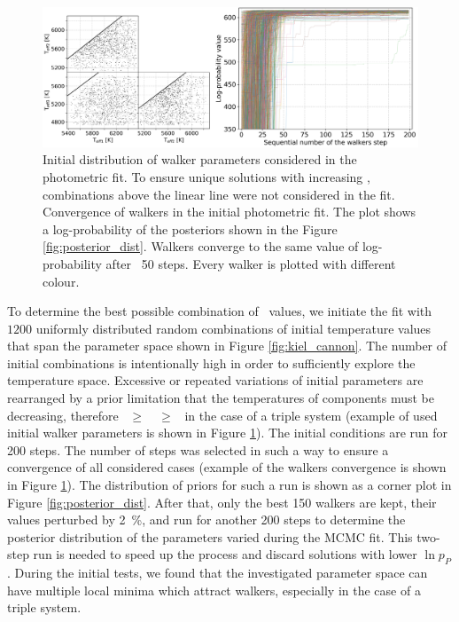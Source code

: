 \begin{figure}
	\centering
	\includegraphics[width=\textwidth]{150408004101169_p1884_init_3_walkers_comb.png}
	\caption{Initial distribution of walker parameters considered in the photometric fit. To ensure unique solutions with increasing \Teff, combinations above the linear line were not considered in the fit. Convergence of walkers in the initial photometric fit. The plot shows a log-probability of the posteriors shown in the Figure \ref{fig:posterior_dist}. Walkers converge to the same value of log-probability after ~50 steps. Every walker is plotted with different colour.}
	\label{fig:teff_initial_walkers}
\end{figure}

To determine the best possible combination of \Teff\ values, we initiate the fit with $1200$ uniformly distributed random combinations of initial temperature values that span the parameter space shown in Figure \ref{fig:kiel_cannon}. The number of initial combinations is intentionally high in order to sufficiently explore the temperature space. Excessive or repeated variations of initial parameters are rearranged by a prior limitation that the temperatures of components must be decreasing, therefore ~$\geq$~~$\geq$~ in the case of a triple system (example of used initial walker parameters is shown in Figure \ref{fig:teff_initial_walkers}). The initial conditions are run for 200 steps. The number of steps was selected in such a way to ensure a convergence of all considered cases (example of the walkers convergence is shown in Figure \ref{fig:teff_initial_walkers}). The distribution of priors for such a run is shown as a corner plot in Figure \ref{fig:posterior_dist}. After that, only the best 150 walkers are kept, their values perturbed by 2~\%, and run for another 200 steps to determine the posterior distribution of the parameters varied during the MCMC fit. This two-step run is needed to speed up the process and discard solutions with lower $\ln p_{P}$. During the initial tests, we found that the investigated parameter space can have multiple local minima which attract walkers, especially in the case of a triple system.

